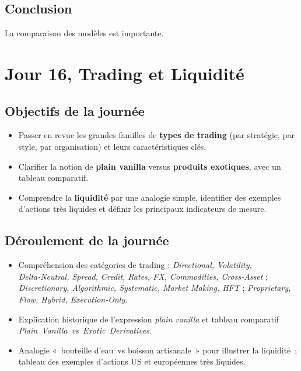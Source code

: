 \documentclass[a4paper,11pt]{article}
\begin{document}
\subsection{Conclusion}
La comparaison des modèles est importante.
\newpage




\section{Jour 16, Trading et Liquidité}

\subsection{Objectifs de la journée}
\begin{itemize}
\item Passer en revue les grandes familles de \textbf{types de trading} (par stratégie, par style, par organisation) et leurs caractéristiques clés.
\item Clarifier la notion de \textbf{plain vanilla} versus \textbf{produits exotiques}, avec un tableau comparatif.
\item Comprendre la \textbf{liquidité} par une analogie simple, identifier des exemples d’actions très liquides et définir les principaux indicateurs de mesure.
\end{itemize}

\subsection{Déroulement de la journée}
\begin{itemize}
\item Compréhension des catégories de trading : \emph{Directional, Volatility, Delta‑Neutral, Spread, Credit, Rates, FX, Commodities, Cross‑Asset} ; \emph{Discretionary, Algorithmic, Systematic, Market Making, HFT} ; \emph{Proprietary, Flow, Hybrid, Execution‑Only}.
\item Explication historique de l’expression \emph{plain vanilla} et tableau comparatif \emph{Plain Vanilla vs Exotic Derivatives}.
\item Analogie « bouteille d’eau vs boisson artisanale » pour illustrer la liquidité ; tableau des exemples d’actions US et européennes très liquides.
\end{itemize}
\end{document}
